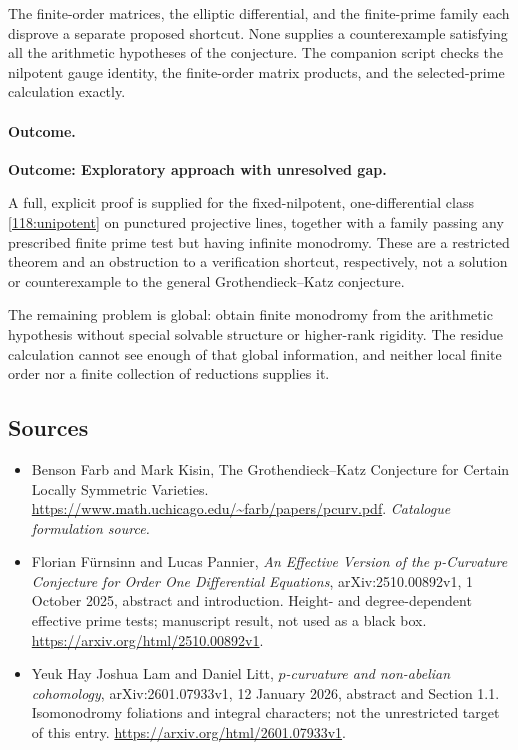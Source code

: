\documentclass[11pt,a4paper]{article}
\numberwithin{equation}{section}
\begin{document}
The finite-order matrices, the elliptic differential, and the finite-prime
family each disprove a separate proposed shortcut. None supplies a
counterexample satisfying all the arithmetic hypotheses of the conjecture.
The companion script checks the nilpotent gauge identity, the finite-order
matrix products, and the selected-prime calculation exactly.

\paragraph{Outcome.}
\textbf{Outcome: Exploratory approach with unresolved gap.}

A full, explicit proof is supplied for the fixed-nilpotent, one-differential
class \eqref{118:unipotent} on punctured projective lines, together with a
family passing any prescribed finite prime test but having infinite
monodromy. These are a restricted theorem and an obstruction to a verification
shortcut, respectively, not a solution or counterexample to the general
Grothendieck--Katz conjecture.

The remaining problem is global: obtain finite monodromy from the arithmetic
hypothesis without special solvable structure or higher-rank rigidity.
The residue calculation cannot see enough of that global information, and
neither local finite order nor a finite collection of reductions supplies it.
\subsection{Sources}
\begin{itemize}\raggedright
\item[\textnormal{[S1]}]\hypertarget{source:118:1}{} Benson Farb and Mark Kisin, The Grothendieck–Katz Conjecture for Certain Locally Symmetric Varieties.
\url{https://www.math.uchicago.edu/~farb/papers/pcurv.pdf}.
{\small\textit{Catalogue formulation source.}}
\item[\textnormal{[E1]}]\hypertarget{extra:118:1}{} Florian F\"urnsinn and Lucas Pannier, \emph{An Effective Version of the $p$-Curvature Conjecture for Order One Differential Equations}, arXiv:2510.00892v1, 1 October 2025, abstract and introduction. Height- and degree-dependent effective prime tests; manuscript result, not used as a black box.
\url{https://arxiv.org/html/2510.00892v1}.
\item[\textnormal{[E2]}]\hypertarget{extra:118:2}{} Yeuk Hay Joshua Lam and Daniel Litt, \emph{$p$-curvature and non-abelian cohomology}, arXiv:2601.07933v1, 12 January 2026, abstract and Section 1.1. Isomonodromy foliations and integral characters; not the unrestricted target of this entry.
\url{https://arxiv.org/html/2601.07933v1}.
\end{itemize}
\end{document}
